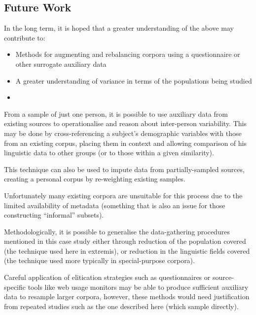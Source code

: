 \subsection{Future Work}

In the long term, it is hoped that a greater understanding of the above may contribute to:

\begin{itemize}
    \item Methods for augmenting and rebalancing corpora using a questionnaire or other surrogate auxiliary data
    \item A greater understanding of variance in terms of the populations being studied
    \item 
\end{itemize}

From a sample of just one person, it is possible to use auxiliary data from existing sources to operationalise and reason about inter-person variability.  This may be done by cross-referencing a subject's demographic variables with those from an existing corpus, placing them in context and allowing comparison of his linguistic data to other groups (or to those within a given similarity).

This technique can also be used to impute data from partially-sampled sources, creating a personal corpus by re-weighting existing samples.

Unfortunately many existing corpora are unsuitable for this process due to the limited availability of metadata (something that is also an issue for those constructing ``informal'' subsets).

Methodologically, it is possible to generalise the data-gathering procedures mentioned in this case study either through reduction of the population covered (the technique used here in extremis), or reduction in the linguistic fields covered (the technique used more typically in special-purpose corpora).

Careful application of elitication strategies such as questionnaires or source-specific tools like web usage monitors may be able to produce sufficient auxiliary data to resample larger corpora, however, these methods would need justification from repeated studies such as the one described here (which sample directly).




